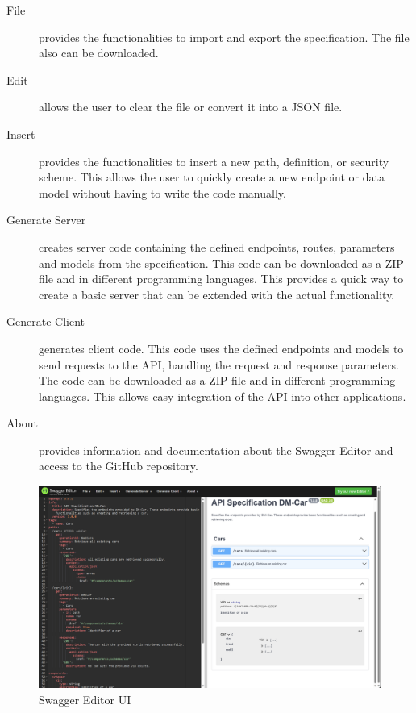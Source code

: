 \begin{description}
    \item[File] provides the functionalities to import and export the specification.
                The file also can be downloaded.
    \item[Edit] allows the user to clear the file or convert it into a JSON file.
    \item[Insert] provides the functionalities to insert a new path, definition, or security scheme.
                This allows the user to quickly create a new endpoint or data model without having to write the code manually.
    \item[Generate Server] creates server code containing the defined endpoints, routes, parameters and models from the specification.
                This code can be downloaded as a ZIP file and in different programming languages.
                This provides a quick way to create a basic server that can be extended with the actual functionality.
    \item[Generate Client] generates client code.
                This code uses the defined endpoints and models to send requests to the API, handling the request and response parameters.
                The code can be downloaded as a ZIP file and in different programming languages.
                This allows easy integration of the API into other applications.
    \item[About] provides information and documentation about the Swagger Editor and access to the GitHub repository.
\end{description}

\begin{figure}
    \centering
    \includegraphics[width=\textwidth]{figures/microservices/dmCar/ms_dmCar_swaggerEditorUI.png}
    \caption{Swagger Editor UI}
    \label{fig:ms_dmCar_swaggerEditorUI}
\end{figure}

